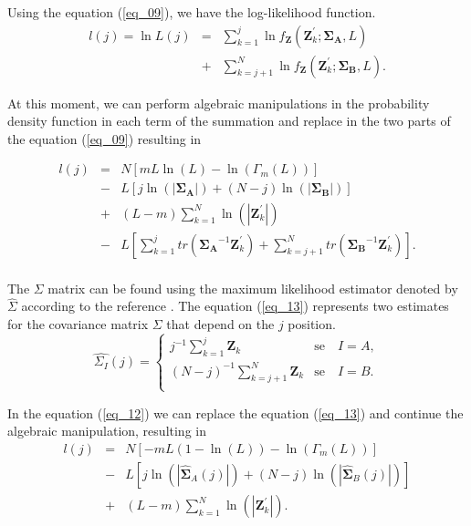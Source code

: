 \documentclass[conference]{IEEEtran}
\begin{document}
{{{{Using the equation (\ref{eq_09}), we have the log-likelihood function.
\begin{equation}
\begin{array}{rcl}\label{eq_11}
	l(j)=\ln L(j)&=&\sum_{k=1}^{j}\ln f_{\mathbf{Z}}(\mathbf{Z}_{k}^{'};\mathbf{\Sigma_{A}},L)\\
	             &+&\sum_{k=j+1}^{N}\ln f_{\mathbf{Z}}(\mathbf{Z}_{k}^{'};\mathbf{\Sigma_{B}},L).
\end{array}
\end{equation}

At this moment, we can perform algebraic manipulations in the probability density function in each term of the summation and replace in the two parts of the equation (\ref{eq_09}) resulting in

\begin{equation}
\begin{array}{lll}\label{eq_12}
	l(j)&=&N\left[mL\ln{\left(L\right)}-\ln{\left(\Gamma_m(L)\right)}\right]\\
	&-& L\left[j\ln{\left(|\mathbf{\Sigma_{A}}|\right)}+(N-j)\ln{\left(|\mathbf{\Sigma_{B}}|\right)}\right] \\
	&+&(L-m)\sum_{k=1}^{N}\ln{\left(|\mathbf{Z}_{k}^{'}|\right)}\\
	&-&L\left[\sum_{k=1}^{j}tr(\mathbf{\Sigma_{A}}^{-1}\mathbf{Z}_{k}^{'})+ \sum_{k=j+1}^{N}tr(\mathbf{\Sigma_{B}}^{-1}\mathbf{Z}_{k}^{'})\right]. \\
\end{array}
\end{equation}

The $\Sigma$ matrix can be found using the maximum likelihood estimator denoted by $\widehat{\Sigma}$ according to the reference \cite{good}. The equation (\ref{eq_13}) represents two estimates for the covariance matrix $\Sigma$ that depend on the $j$ position.
\begin{equation}\label{eq_13}
\widehat{\Sigma_{I}}(j) = \left\{
\begin{array}{lc}
	j^{-1}\sum_{k=1}^{j}\mathbf{Z}_{k}  & \mbox{se}\quad I=A,  \\
        (N-j)^{-1}\sum_{k=j+1}^{N}\mathbf{Z}_{k} & \mbox{se}\quad I=B. \\
\end{array}
\right.
\end{equation}

In the equation (\ref{eq_12}) we can replace the equation (\ref{eq_13}) and continue the algebraic manipulation, resulting in 
\begin{equation}\label{eq_14}
\begin{array}{rcl}
	l(j)&=&N\left[-mL(1-\ln{\left(L\right)})-\ln{\left(\Gamma_m(L)\right)}\right]\\
	&-&L\left[j\ln{\left(|\mathbf{\widehat{\Sigma}}_{A}(j)|\right)} +(N-j)\ln{\left(|\mathbf{\widehat{\Sigma}}_{B}(j)|\right)}\right]\\
	&+&(L-m)\sum_{k=1}^{N}\ln{\left(|\mathbf{Z}_{k}^{'}|\right)}. \\
\end{array}
\end{equation}

}}}}
\end{document}
